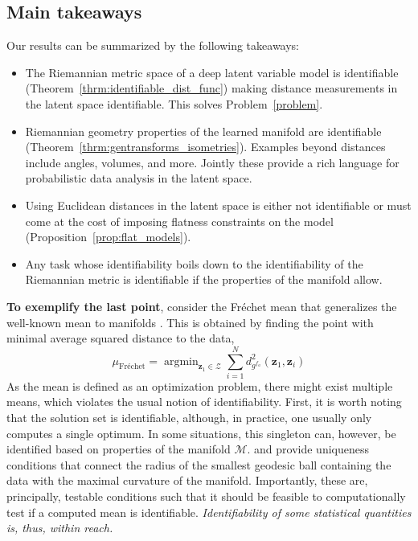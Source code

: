\subsection{Main takeaways}
Our results can be summarized by the following takeaways:
\begin{itemize}
    \item The Riemannian metric space of a deep latent variable model is identifiable (Theorem~\ref{thrm:identifiable_dist_func}) making distance measurements in the latent space identifiable. This solves Problem~\ref{problem}.
    \item Riemannian geometry properties of the learned manifold are identifiable (Theorem~\ref{thrm:gentransforms_isometries}). Examples beyond distances include angles, volumes, and more. Jointly these provide a rich language for probabilistic data analysis in the latent space.
    \item Using Euclidean distances in the latent space is either not identifiable or must come at the cost of imposing flatness constraints on the model (Proposition~\ref{prop:flat_models}).
    \item Any task whose identifiability boils down to the identifiability of the Riemannian metric is identifiable if the properties of the manifold allow. 

\end{itemize}

\textbf{To exemplify the last point}, consider the Fr{\'e}chet mean that generalizes the well-known mean to manifolds \citep{pennec2006intrinsic}. This is obtained by finding the point with minimal average squared distance to the data,
\begin{equation}
\label{eq:karcher}
  \mu_{\text{Fr{\' e}chet}} = \mathop {\text{argmin}} _{\mathbf{z}_1\in \mathcal{Z}}\sum _{i=1}^{N}d_{g^{f_a}}^{2}\left(\mathbf{z}_1,\mathbf{z}_{i}\right)
\end{equation}
As the mean is defined as an optimization problem, there might exist multiple means, which violates the usual notion of identifiability. First, it is worth noting that the solution set is identifiable, although, in practice, one usually only computes a single optimum. In some situations, this singleton can, however, be identified based on properties of the manifold $\mathcal{M}$. \citet{karcher1977riemannian} and \citet{kendall1990probability} provide uniqueness conditions that connect the radius of the smallest geodesic ball containing the data with the maximal curvature of the manifold. Importantly, these are, principally, testable conditions such that it should be feasible to computationally test if a computed mean is identifiable. \emph{Identifiability of some statistical quantities is, thus, within reach.}

